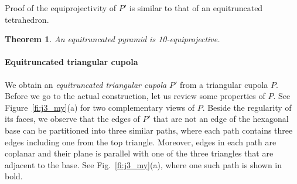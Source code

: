 \documentclass{article}
\newtheorem{theorem}{Theorem}
\begin{document}
Proof of the equiprojectivity of $P'$ is similar to that of an equitruncated tetrahedron.

\begin{theorem}
\label{th:P2}
An equitruncated pyramid is 10-equiprojective.
\end{theorem}


\paragraph{Equitruncated triangular cupola}
We obtain an \emph{equitruncated triangular cupola} $P'$ from a triangular cupola $P$.
Before we go to the actual construction, let us review some properties of $P$.
See Figure~\ref{fi:j3_my}(a) for two complementary views of $P$.
Beside the regularity of its faces,
we observe that the edges of $P'$ that are not an edge of the hexagonal base 
can be partitioned into three similar paths, where each path contains three edges including one from the top triangle.
Moreover, edges in each path are coplanar and their plane is parallel with one of the three triangles that are adjacent to the base. 
See Fig.~\ref{fi:j3_my}(a), where one such path is shown in bold.
\end{document}
